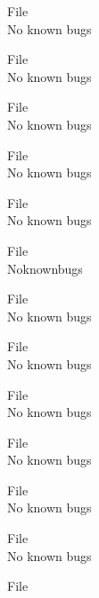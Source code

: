 \begin{DoxyRefList}
\item[File \doxylink{GLOBAL_8h}{GLOBAL.h} ]\hfill \\
\label{bug__bug000012}%
%
No known bugs  
\item[File \doxylink{gmst_8cpp}{gmst.cpp} ]\hfill \\
\label{bug__bug000048}%
%
No known bugs  
\item[File \doxylink{gmst_8h}{gmst.h} ]\hfill \\
\label{bug__bug000013}%
%
No known bugs  
\item[File \doxylink{IERS_8cpp}{IERS.cpp} ]\hfill \\
\label{bug__bug000049}%
%
No known bugs  
\item[File \doxylink{IERS_8h}{IERS.h} ]\hfill \\
\label{bug__bug000014}%
%
No known bugs  
\item[File \doxylink{JPL__Eph__DE430_8cpp}{JPL\+\_\+\+Eph\+\_\+\+DE430.cpp} ]\hfill \\
\label{bug__bug000050}%
%
Noknownbugs  
\item[File \doxylink{JPL__Eph__DE430_8h}{JPL\+\_\+\+Eph\+\_\+\+DE430.h} ]\hfill \\
\label{bug__bug000015}%
%
No known bugs  
\item[File \doxylink{Legendre_8cpp}{Legendre.cpp} ]\hfill \\
\label{bug__bug000051}%
%
No known bugs  
\item[File \doxylink{Legendre_8h}{Legendre.h} ]\hfill \\
\label{bug__bug000016}%
%
No known bugs  
\item[File \doxylink{LTC_8cpp}{LTC.cpp} ]\hfill \\
\label{bug__bug000052}%
%
No known bugs  
\item[File \doxylink{LTC_8h}{LTC.h} ]\hfill \\
\label{bug__bug000017}%
%
No known bugs  
\item[File \doxylink{matrix_8cpp}{matrix.cpp} ]\hfill \\
\label{bug__bug000053}%
%
No known bugs  
\item[File \doxylink{matrix_8h}{matrix.h} ]\hfill \\

\end{DoxyRefList}
